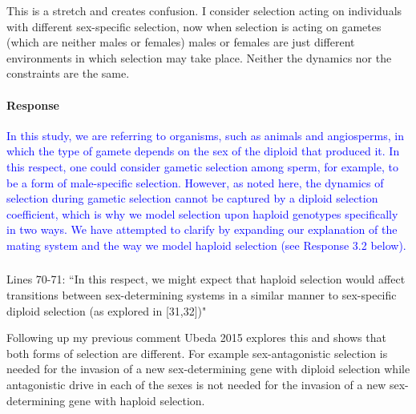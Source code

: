 \documentclass[10pt,letterpaper]{article}
\begin{document}
This is a stretch and creates confusion. I consider selection acting on individuals with different sex-specific selection, now when selection is acting on gametes (which are neither males or females) males or females are just different environments in which selection may take place. Neither the dynamics nor the constraints are the same. 

\noindent\paragraph{Response}
\textcolor{blue}{In this study, we are referring to organisms, such as animals and angiosperms, in which the type of gamete depends on the sex of the diploid that produced it. In this respect, one could consider gametic selection among sperm, for example, to be a form of male-specific selection. However, as noted here, the dynamics of selection during gametic selection cannot be captured by a diploid selection coefficient, which is why we model selection upon haploid genotypes specifically in two ways. }
\textcolor{blue}{
We have attempted to clarify by expanding our explanation of the mating system and the way we model haploid selection (see Response 3.2 below).}

\noindent\subsubsection{}
Lines 70-71: ``In this respect, we might expect that haploid selection would affect transitions between sex-determining systems in a similar manner to sex-specific diploid selection (as explored in [31,32])" 

Following up my previous comment Ubeda 2015 explores this and shows that both forms of selection are different. For example sex-antagonistic selection is needed for the invasion of a new sex-determining gene with diploid selection while antagonistic drive in each of the sexes is not needed for the invasion of a new sex-determining gene with haploid selection.
\end{document}
